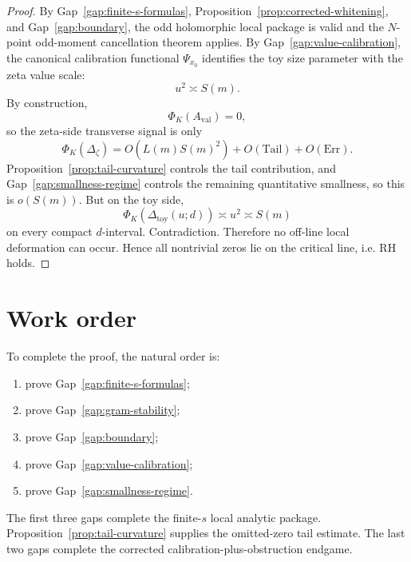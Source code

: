 \documentclass[11pt]{article}
\theoremstyle{plain}
\theoremstyle{definition}
\newcommand{\RH}{\mathrm{RH}}
\newcommand{\Psical}{\Psi}
\newcommand{\toy}{\mathrm{toy}}
\newcommand{\val}{\mathrm{val}}
\newcommand{\Err}{\mathrm{Err}}
\newcommand{\Tail}{\mathrm{Tail}}
\newcommand{\Aval}{A_{\val}}
\begin{document}
\begin{proof}
By Gap~\ref{gap:finite-s-formulas}, Proposition~\ref{prop:corrected-whitening}, and Gap~\ref{gap:boundary}, the odd holomorphic local package is valid and the $N$-point odd-moment cancellation theorem applies. By Gap~\ref{gap:value-calibration}, the canonical calibration functional $\Psical_{x_0}$ identifies the toy size parameter with the zeta value scale:
\[
u^2\asymp S(m).
\]
By construction,
\[
\Phi_K(\Aval)=0,
\]
so the zeta-side transverse signal is only
\[
\Phi_K(\Delta_\zeta)=O(L(m)S(m)^2)+O(\Tail)+O(\Err).
\]
Proposition~\ref{prop:tail-curvature} controls the tail contribution, and Gap~\ref{gap:smallness-regime} controls the remaining quantitative smallness, so this is $o(S(m))$. But on the toy side,
\[
\Phi_K(\Delta_\toy(u;d))\asymp u^2\asymp S(m)
\]
on every compact $d$-interval. Contradiction. Therefore no off-line local deformation can occur. Hence all nontrivial zeros lie on the critical line, i.e. $\RH$ holds.
\end{proof}

\section{Work order}

To complete the proof, the natural order is:
\begin{enumerate}[label=\arabic*.]
\item prove Gap~\ref{gap:finite-s-formulas};
\item prove Gap~\ref{gap:gram-stability};
\item prove Gap~\ref{gap:boundary};
\item prove Gap~\ref{gap:value-calibration};
\item prove Gap~\ref{gap:smallness-regime}.
\end{enumerate}

The first three gaps complete the finite-$s$ local analytic package. Proposition~\ref{prop:tail-curvature} supplies the omitted-zero tail estimate. The last two gaps complete the corrected calibration-plus-obstruction endgame.
\end{document}
